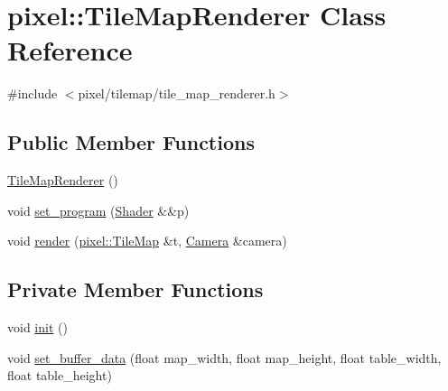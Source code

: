\hypertarget{classpixel_1_1_tile_map_renderer}{}\section{pixel\+:\+:Tile\+Map\+Renderer Class Reference}
\label{classpixel_1_1_tile_map_renderer}


{\ttfamily \#include $<$pixel/tilemap/tile\+\_\+map\+\_\+renderer.\+h$>$}

\subsection*{Public Member Functions}
\begin{DoxyCompactItemize}
\item 
\hyperlink{classpixel_1_1_tile_map_renderer_a4b2169226cf57b482c2ad0379af86f2a}{Tile\+Map\+Renderer} ()
\item 
void \hyperlink{classpixel_1_1_tile_map_renderer_a4dbc58190d1f546ff8970cfc3bcbdd4c}{set\+\_\+program} (\hyperlink{classpixel_1_1graphics_1_1_shader}{Shader} \&\&p)
\item 
void \hyperlink{classpixel_1_1_tile_map_renderer_ab45a26de69452d0d14c94180381f2837}{render} (\hyperlink{classpixel_1_1_tile_map}{pixel\+::\+Tile\+Map} \&t, \hyperlink{classpixel_1_1graphics_1_1_camera}{Camera} \&camera)
\end{DoxyCompactItemize}
\subsection*{Private Member Functions}
\begin{DoxyCompactItemize}
\item 
void \hyperlink{classpixel_1_1_tile_map_renderer_a3a014359e9a5030dbae6fd267eafe1e3}{init} ()
\item 
void \hyperlink{classpixel_1_1_tile_map_renderer_a4cac61173817988144b56d0b56304bb4}{set\+\_\+buffer\+\_\+data} (float map\+\_\+width, float map\+\_\+height, float table\+\_\+width, float table\+\_\+height)
\end{DoxyCompactItemize}
